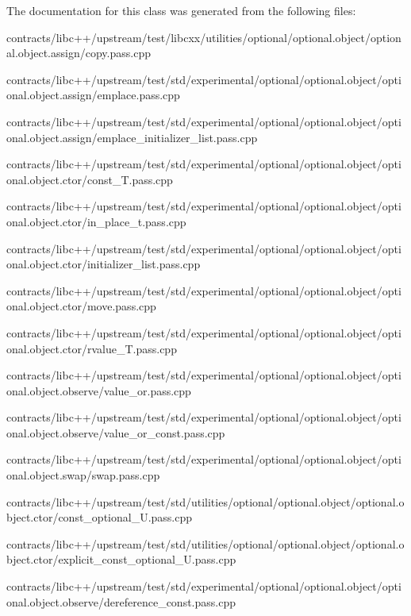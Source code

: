 The documentation for this class was generated from the following files\+:\begin{DoxyCompactItemize}
\item 
contracts/libc++/upstream/test/libcxx/utilities/optional/optional.\+object/optional.\+object.\+assign/copy.\+pass.\+cpp\item 
contracts/libc++/upstream/test/std/experimental/optional/optional.\+object/optional.\+object.\+assign/emplace.\+pass.\+cpp\item 
contracts/libc++/upstream/test/std/experimental/optional/optional.\+object/optional.\+object.\+assign/emplace\+\_\+initializer\+\_\+list.\+pass.\+cpp\item 
contracts/libc++/upstream/test/std/experimental/optional/optional.\+object/optional.\+object.\+ctor/const\+\_\+\+T.\+pass.\+cpp\item 
contracts/libc++/upstream/test/std/experimental/optional/optional.\+object/optional.\+object.\+ctor/in\+\_\+place\+\_\+t.\+pass.\+cpp\item 
contracts/libc++/upstream/test/std/experimental/optional/optional.\+object/optional.\+object.\+ctor/initializer\+\_\+list.\+pass.\+cpp\item 
contracts/libc++/upstream/test/std/experimental/optional/optional.\+object/optional.\+object.\+ctor/move.\+pass.\+cpp\item 
contracts/libc++/upstream/test/std/experimental/optional/optional.\+object/optional.\+object.\+ctor/rvalue\+\_\+\+T.\+pass.\+cpp\item 
contracts/libc++/upstream/test/std/experimental/optional/optional.\+object/optional.\+object.\+observe/value\+\_\+or.\+pass.\+cpp\item 
contracts/libc++/upstream/test/std/experimental/optional/optional.\+object/optional.\+object.\+observe/value\+\_\+or\+\_\+const.\+pass.\+cpp\item 
contracts/libc++/upstream/test/std/experimental/optional/optional.\+object/optional.\+object.\+swap/swap.\+pass.\+cpp\item 
contracts/libc++/upstream/test/std/utilities/optional/optional.\+object/optional.\+object.\+ctor/const\+\_\+optional\+\_\+\+U.\+pass.\+cpp\item 
contracts/libc++/upstream/test/std/utilities/optional/optional.\+object/optional.\+object.\+ctor/explicit\+\_\+const\+\_\+optional\+\_\+\+U.\+pass.\+cpp\item 
contracts/libc++/upstream/test/std/experimental/optional/optional.\+object/optional.\+object.\+observe/dereference\+\_\+const.\+pass.\+cpp\item 

\end{DoxyCompactItemize}
